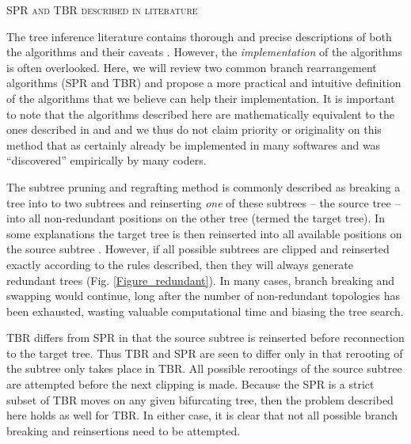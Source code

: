\documentclass[12pt,letterpaper]{article}
\renewcommand{\section}[1]{%
\bigskip
\begin{center}
\begin{Large}
\normalfont\scshape #1
\medskip
\end{Large}
\end{center}}
\begin{document}
\section{SPR and TBR described in literature}
The tree inference literature contains thorough and precise descriptions of both the algorithms \citep[e.g.][]{allen2001subtree,felsenstein2004inferring} and their caveats \citep[i.e speed and reliability - e.g.][]{morrison2007increasing,lakner2008efficiency,goloboff2014bias}.
However, the \textit{implementation} of the algorithms is often overlooked.
Here, we will review two common branch rearrangement algorithms (SPR and TBR) and propose a more practical and intuitive definition of the algorithms that we believe can help their implementation.
It is important to note that the algorithms described here are mathematically equivalent to the ones described in \cite{allen2001subtree} and \cite{felsenstein2004inferring} and we thus do not claim priority or originality on this method that as certainly already be implemented in many softwares and was ``discovered'' empirically by many coders.

The subtree pruning and regrafting method is commonly described as breaking a tree into to two subtrees and reinserting \textit{one} of these subtrees -- the source tree -- into all non-redundant positions on the other tree (termed the target tree).
In some explanations the target tree is then reinserted into all available positions on the source subtree \citep[e.g.][Fig. 8.5]{swofford2003phylogeny}.
However, if all possible subtrees are clipped and reinserted exactly according to the rules described, then they will always generate redundant trees (Fig. \ref{Figure_redundant}).
In many cases, branch breaking and swapping would continue, long after the number of non-redundant topologies has been exhausted, wasting valuable computational time and biasing the tree search.

TBR differs from SPR in that the source subtree is reinserted before reconnection to the target tree.
Thus TBR and SPR are seen to differ only in that rerooting of the subtree only takes place in TBR.
All possible rerootings of the source subtree are attempted before the next clipping is made.
Because the SPR is a strict subset of TBR moves on any given bifurcating tree, then the problem described here holds as well for TBR. %
In either case, it is clear that not all possible branch breaking and reinsertions need to be attempted.
\end{document}
